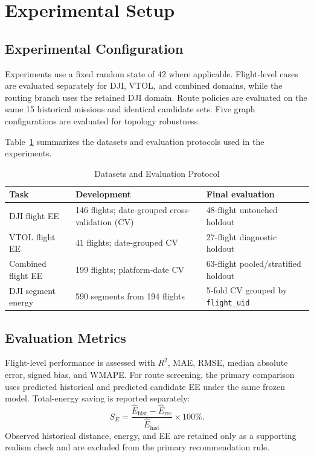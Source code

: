 \documentclass[conference,a4paper]{IEEEtran}
\begin{document}
\section{Experimental Setup}

\subsection{Experimental Configuration}
Experiments use a fixed random state of 42 where applicable. Flight-level cases are evaluated separately for DJI, VTOL, and combined domains, while the routing branch uses the retained DJI domain. Route policies are evaluated on the same 15 historical missions and identical candidate sets. Five graph configurations are evaluated for topology robustness.

Table~\ref{tab:protocol} summarizes the datasets and evaluation protocols
used in the experiments.

\begin{table}[H]
\caption{Datasets and Evaluation Protocol}
\label{tab:protocol}
\centering
\scriptsize
\setlength{\tabcolsep}{2.5pt}
\begin{tabular}{p{}p{}p{}}
\toprule
Task & Development & Final evaluation \\
\midrule
DJI flight EE & 146 flights; date-grouped cross-validation (CV)
& 48-flight untouched holdout \\
VTOL flight EE & 41 flights; date-grouped CV
& 27-flight diagnostic holdout \\
Combined flight EE & 199 flights; platform-date CV
& 63-flight pooled/stratified holdout \\
DJI segment energy & 590 segments from 194 flights
& 5-fold CV grouped by \texttt{flight\_uid} \\
\bottomrule
\end{tabular}
\end{table}

\subsection{Evaluation Metrics}
Flight-level performance is assessed with $R^2$, MAE, RMSE, median absolute error, signed bias, and WMAPE. For route screening, the primary comparison uses predicted historical and predicted candidate EE under the same frozen model. Total-energy saving is reported separately:
\begin{equation}
S_E=\frac{\widehat{E}_{\mathrm{hist}}-\widehat{E}_{\mathrm{rec}}}{\widehat{E}_{\mathrm{hist}}}\times100\%.
\end{equation}
Observed historical distance, energy, and EE are retained only as a supporting realism check and are excluded from the primary recommendation rule.
\end{document}
